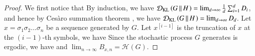 \begin{proof}
We first notice that
By induction, we have $\mathcal{D}_{\textrm{KL}}\left( G\,{\left\Vert\,H\right.} \right) = \lim_{d\rightarrow\infty}\frac{1}{d}\sum_{i=1}^{d}D_{i}$, 
and hence by Ces\`{a}ro summation theorem \cite{hardy1992divergent}, we have $\mathcal{D}_{\textrm{KL}}\left( G\,{\left\Vert\,H\right.} \right) = \lim_{d\rightarrow\infty} D_d$. Let $x=\sigma_1\sigma_2...\sigma_n$ be a sequence generated by $G$. Let $x^{[i-1]}$ is the truncation of $x$ at the $(i-1)$-th symbols, we have
Since the stochastic process $G$ generates is ergodic, we have
and $\lim_{n\rightarrow\infty}B_{x,n} = \mathcal{H}(G)$.
\end{proof} 

